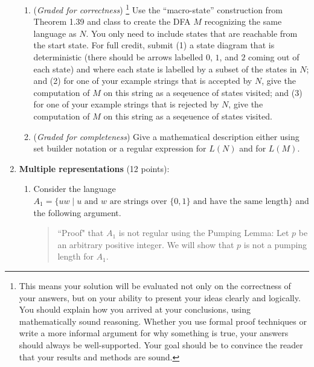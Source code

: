 \documentclass[12pt, oneside]{article}
\newcommand{\gradeCorrect}{({\it Graded for correctness}) }
\newcommand{\gradeCorrectFirst}{\gradeCorrect\footnote{This means your solution 
will be evaluated not only on the correctness of your answers, but on your ability
to present your ideas clearly and logically. You should explain how you 
arrived at your conclusions, using
mathematically sound reasoning. Whether you use formal proof techniques or 
write a more informal argument
for why something is true, your answers should always be well-supported. 
Your goal should be to convince the
reader that your results and methods are sound.} }
\newcommand{\gradeComplete}{({\it Graded for completeness}) }
\begin{document}
\begin{enumerate}[wide, labelwidth=!, labelindent=0pt]
\begin{enumerate}
      \item\gradeCorrectFirst Use the ``macro-state'' construction from Theorem 1.39 and class to create the DFA
      $M$ recognizing the same language as $N$. You only need to include states that are reachable from the start
      state. For full credit, submit (1) a state diagram that is deterministic (there should be arrows labelled $0$, $1$, and 
      $2$ coming out of each state) and where each state is labelled by a subset of the states in $N$; 
      and (2) for one of your example strings that is accepted by $N$, give the computation of $M$ on this string as a 
      seqeuence of states visited; and (3) for one of your example strings that is rejected by $N$, 
      give the computation of $M$ on this string as a seqeuence of states visited.

      \item\gradeComplete Give a mathematical description either using set builder notation or a regular expression
      for $L(N)$ and for $L(M)$.
    \end{enumerate}

\item \textbf{Multiple representations} (12 points):

\begin{enumerate}
   \item Consider the language $A_1 = \{ uw \mid \text{$u$ and
   $w$ are strings over $\{0,1\}$ and have the same length} \}$
   and the following argument.

   \begin{quote}
      ``Proof" that $A_1$ is not regular using the Pumping Lemma: Let $p$ be 
      an arbitrary positive integer. We will show that $p$ is not a pumping length for $A_1$. 
      

\end{quote}
\end{enumerate}
\end{enumerate}
\end{document}
